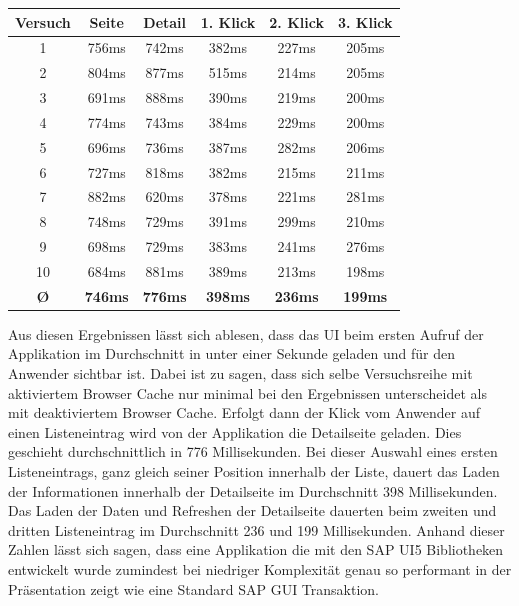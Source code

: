 \vspace{1em}
\begin{center}
  \begin{tabular}{ | c | c | c | c | c | c | }
    \hline
    \textbf{Versuch}
    & \textbf{Seite} & \textbf{Detail} & \textbf{1. Klick} & \textbf{2. Klick} & \textbf{3. Klick}\\
    \hline \hline
    1 & 756ms & 742ms & 382ms & 227ms & 205ms\\
    \hline
    2 & 804ms & 877ms & 515ms & 214ms & 205ms\\
    \hline
    3 & 691ms & 888ms & 390ms & 219ms & 200ms\\
    \hline
    4 & 774ms & 743ms & 384ms & 229ms & 200ms\\
    \hline
    5 & 696ms & 736ms & 387ms & 282ms & 206ms\\
    \hline
    6 & 727ms & 818ms & 382ms & 215ms & 211ms\\
    \hline
    7 & 882ms & 620ms & 378ms & 221ms & 281ms\\
    \hline
    8 & 748ms & 729ms & 391ms & 299ms & 210ms\\
    \hline
    9 & 698ms & 729ms & 383ms & 241ms & 276ms\\
    \hline
    10 & 684ms & 881ms & 389ms & 213ms & 198ms\\
    \hline \hline
    \textbf{\O} & \textbf{746ms} & \textbf{776ms} & \textbf{398ms} & \textbf{236ms} & \textbf{199ms}\\
    \hline
  \end{tabular}
\label{tab:uiloading}
\end{center}

Aus diesen Ergebnissen lässt sich ablesen, dass das UI beim ersten Aufruf der Applikation im Durchschnitt in unter einer Sekunde geladen und für den Anwender sichtbar ist. Dabei ist zu sagen, dass sich selbe Versuchsreihe mit aktiviertem Browser Cache nur minimal bei den Ergebnissen unterscheidet als mit deaktiviertem Browser Cache. Erfolgt dann der Klick vom Anwender auf einen Listeneintrag wird von der Applikation die Detailseite geladen. Dies geschieht durchschnittlich in 776 Millisekunden. Bei dieser Auswahl eines ersten Listeneintrags, ganz gleich seiner Position innerhalb der Liste, dauert das Laden der Informationen innerhalb der Detailseite im Durchschnitt 398 Millisekunden. Das Laden der Daten und Refreshen der Detailseite dauerten beim zweiten und dritten Listeneintrag im Durchschnitt 236 und 199 Millisekunden. Anhand dieser Zahlen lässt sich sagen, dass eine Applikation die mit den SAP UI5 Bibliotheken entwickelt wurde zumindest bei niedriger Komplexität genau so performant in der Präsentation zeigt wie eine Standard SAP GUI Transaktion.
